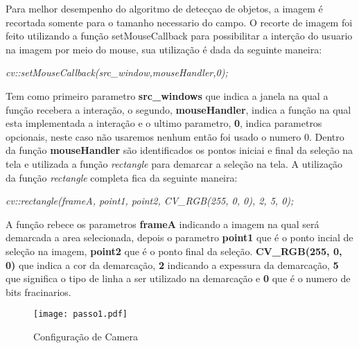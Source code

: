Para melhor desempenho do algoritmo de detecçao de objetos, a imagem é recortada somente para o tamanho necessario do campo. O recorte de imagem foi feito utilizando a função setMouseCallback para possibilitar a interção do usuario na imagem por meio do mouse, sua utilização é dada da seguinte maneira:
\begin{center}
\centering \textit{ cv::setMouseCallback(src\_window,mouseHandler,0);}
\end{center}
Tem como primeiro parametro \textbf{src\_windows} que indica a janela na qual a função recebera a interação,  o segundo, \textbf{mouseHandler}, indica a função na qual esta implementada a interação e o ultimo parametro, \textbf{0}, indica parametros opcionais, neste caso não usaremos nenhum então foi usado o numero 0.
Dentro da função \textbf{mouseHandler} são identificados os pontos iniciai e final da seleção na tela e utilizada a função \textit{rectangle} para demarcar a seleção na tela. A utilização da função \textit{rectangle} completa fica da seguinte maneira:
\begin{center}
\centering \textit{ cv::rectangle(frameA, point1, point2, CV\_RGB(255, 0, 0), 2, 5, 0);}
\end{center}
A função rebece os parametros \textbf{frameA} indicando a imagem na qual será demarcada a area selecionada, depois o parametro \textbf{point1} que é o ponto incial de seleção na imagem, \textbf{point2} que é o ponto final da seleção. \textbf{CV\_RGB(255, 0, 0)} que indica a cor da demarcação, \textbf{2} indicando a expessura da demarcação, \textbf{5} que significa o tipo de linha a ser utilizado na demarcação e \textbf{0} que é o numero de bits fracinarios.

\begin{figure}[H]
			\centering
			\texttt{[image: passo1.pdf]}
			\caption{ Configuração de Camera}
			\label{Configuracao}
		\end{figure}		


